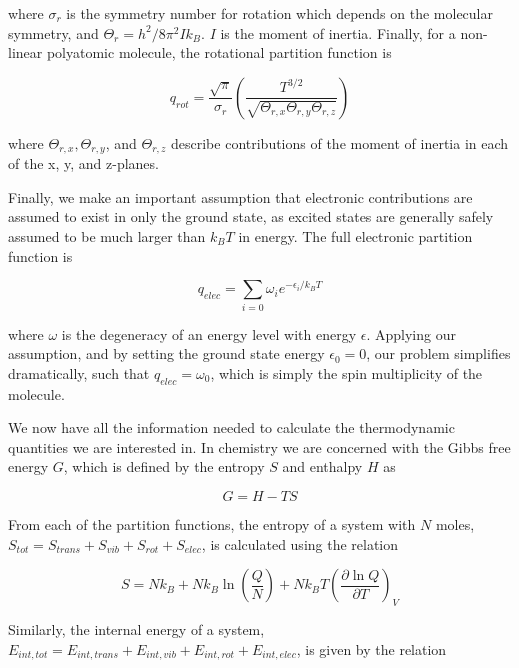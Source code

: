 \noindent where $\sigma_r$ is the symmetry number for rotation which depends on the molecular symmetry, and $\Theta_r = h^2/8\pi^2Ik_B$. $I$ is the moment of inertia. Finally, for a non-linear polyatomic molecule, the rotational partition function is

\begin{equation}
  q_{rot} = \frac{\sqrt{\pi}}{\sigma_r}\left(\frac{T^{3/2}}{\sqrt{\Theta_{r,x}\Theta_{r,y}\Theta_{r,z}}}\right)
\end{equation}

\noindent where $\Theta_{r,x}, \Theta_{r,y}$, and $\Theta_{r,z}$ describe contributions of the moment of inertia in each of the x, y, and z-planes.

Finally, we make an important assumption that electronic contributions are assumed to exist in only the ground state, as excited states are generally safely assumed to be much larger than $k_B T$ in energy. The full electronic partition function is

\begin{equation}
  q_{elec} = \sum_{i=0} \omega_i e^{-\epsilon_i/k_B T}
\end{equation}

\noindent where $\omega$ is the degeneracy of an energy level with energy $\epsilon$. Applying our assumption, and by setting the ground state energy $\epsilon_0=0$, our problem simplifies dramatically, such that $q_{elec} = \omega_0$, which is simply the spin multiplicity of the molecule.

We now have all the information needed to calculate the thermodynamic quantities we are interested in. In chemistry we are concerned with the Gibbs free energy $G$, which is defined by the entropy $S$ and enthalpy $H$ as

\begin{equation}
  G = H - TS
\end{equation}

\noindent From each of the partition functions, the entropy of a system with $N$ moles, $S_{tot} = S_{trans} + S_{vib } +S_{rot} + S_{elec}$, is calculated using the relation

\begin{equation}
  S = Nk_B + Nk_B\ln\left( \frac{Q}{N} \right) + Nk_B T \left( \frac{\partial
      \ln Q}{\partial T} \right)_V
\end{equation}

\noindent Similarly, the internal energy of a system, $E_{int,tot} = E_{int,trans} + E_{int,vib} + E_{int,rot} + E_{int,elec}$, is given by the relation


